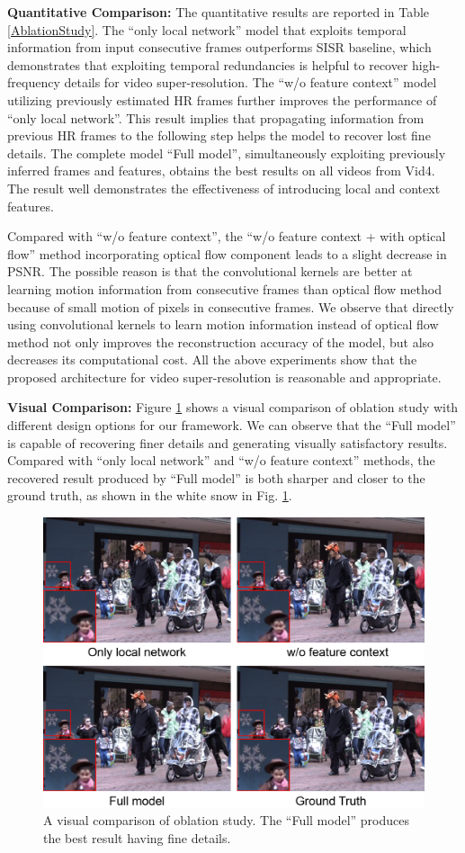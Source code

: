 \documentclass[letterpaper]{article} %
\begin{document}
\textbf{Quantitative Comparison:} The quantitative results are reported in Table \ref{AblationStudy}. The ``only local network'' model that exploits temporal information from input consecutive frames outperforms SISR baseline, which demonstrates that exploiting temporal redundancies is helpful to recover high-frequency details for video super-resolution. The ``w/o feature context'' model utilizing previously estimated HR frames further improves the performance of ``only local network''. This result implies that propagating information from previous HR frames to the following step helps the model to recover lost fine details. The complete model ``Full model'', simultaneously exploiting previously inferred frames and features, obtains the best results on all videos from Vid4. The result well demonstrates the effectiveness of introducing local and context features.



Compared with ``w/o feature context'', the ``w/o feature context + with optical flow'' method incorporating optical flow component leads to a slight decrease in PSNR. The possible reason is that the convolutional kernels are better at learning motion information from consecutive frames than optical flow method because of small motion of pixels in consecutive frames. We observe that directly using convolutional kernels to learn motion information instead of optical flow method not only improves the reconstruction accuracy of the model, but also decreases its computational cost. All the above experiments show that the proposed architecture for video super-resolution is reasonable and appropriate.


\textbf{Visual Comparison:} Figure \ref{VisualAblationStudy} shows a visual comparison of oblation study with different design options for our framework. We can observe that the ``Full model'' is capable of recovering finer details and generating visually satisfactory results. Compared with ``only local network'' and ``w/o feature context'' methods, the recovered result produced by ``Full model'' is both sharper and closer to the ground truth, as shown in the white snow in Fig. \ref{VisualAblationStudy}.


\begin{figure}[t]
\centering
\includegraphics[width=7 cm]{Fig6.png}
\caption{A visual comparison of oblation study. The ``Full model'' produces the best result having fine details.}
\label{VisualAblationStudy}
\end{figure}
\end{document}
